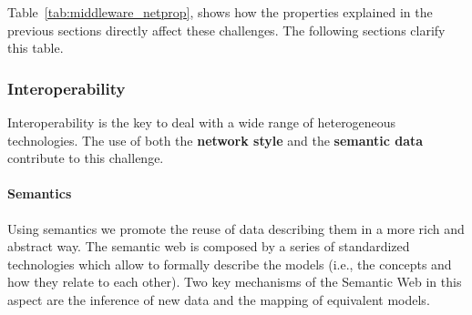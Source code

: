 Table~\ref{tab:middleware_netprop}, shows how the properties explained in the previous sections directly affect these challenges.
The following sections clarify this table.







\subsubsection{Interoperability}


Interoperability is the key to deal with a wide range of heterogeneous technologies.
The use of both the \textbf{network style} and the \textbf{semantic data} contribute to this challenge.


\paragraph{Semantics}

Using semantics we promote the reuse of data describing them in a more rich and abstract way.
The semantic web is composed by a series of standardized technologies which allow to formally describe the models (i.e., the concepts and how they relate to each other).
Two key mechanisms of the Semantic Web in this aspect are the inference of new data and the mapping of equivalent models.



